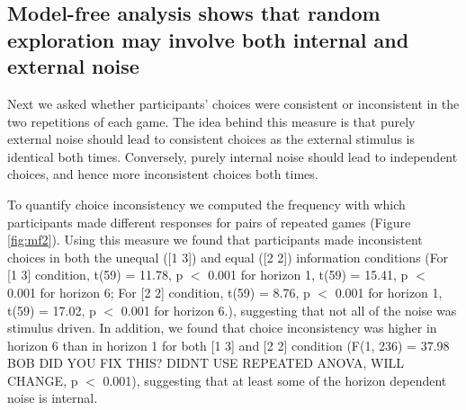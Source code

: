 \documentclass[12pt]{article}
\begin{document}
	
	\subsection*{Model-free analysis shows that random exploration may involve both internal and external noise}
	
	
	Next we asked whether participants' choices were consistent or inconsistent in the two repetitions of each game.  The idea behind this measure is that purely external noise should lead to consistent choices as the external stimulus is identical both times. Conversely, purely internal noise should lead to independent choices, and hence more inconsistent choices both times. 
	
	To quantify choice inconsistency we computed the frequency with which participants made different responses for pairs of repeated games (Figure \ref{fig:mf2}). Using this measure we found that participants made inconsistent choices in both the unequal ([1 3]) and equal ([2 2]) information conditions (For [1 3] condition, t(59) = 11.78, p $<$ 0.001 for horizon 1, t(59) = 15.41, p $<$ 0.001 for horizon 6; For [2 2] condition, t(59) = 8.76, p $<$ 0.001 for horizon 1, t(59) = 17.02, p $<$ 0.001 for horizon 6.), suggesting that not all of the noise was stimulus driven. In addition, we found that choice inconsistency was higher in horizon 6 than in horizon 1 for both [1 3] and [2 2] condition (F(1, 236) = 37.98 BOB DID YOU FIX THIS? DIDNT USE REPEATED ANOVA, WILL CHANGE, p $<$ 0.001), suggesting that at least some of the horizon dependent noise is internal.
	
\end{document}
